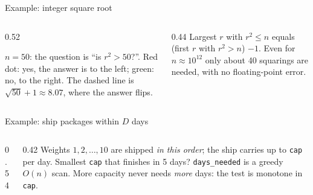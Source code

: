 \documentclass[aspectratio=169,10pt]{beamer}
\begin{document}
\begin{frame}{Example: integer square root}
\begin{columns}[T]
\begin{column}{0.52\textwidth}
\begin{sfig}[0.78]
\begin{tikzpicture}
  
\end{tikzpicture}
\end{sfig}
\vspace{1mm}
{\small $n=50$: the question is ``is $r^2>50$?''. Red dot: yes, the answer is to the left; green: no, to the right. The dashed line is $\sqrt{50}+1\approx 8.07$, where the answer flips.}
\end{column}
\begin{column}{0.44\textwidth}
\vspace{2mm}
\vspace{1mm}
{\small
Largest $r$ with $r^2\le n$ equals (first $r$ with $r^2>n$) $-1$. Even for $n\approx10^{12}$ only about 40 squarings are needed, with no floating-point error.}
\end{column}
\end{columns}
\end{frame}

\begin{frame}{Example: ship packages within $D$ days}
\begin{columns}[T]
\begin{column}{0.54\textwidth}
\end{column}
\begin{column}{0.42\textwidth}
{\small Weights $1,2,\dots,10$ are shipped \emph{in this order}; the ship carries up to \texttt{cap} per day. Smallest \texttt{cap} that finishes in 5 days?}
\vspace{1mm}
\vspace{1mm}
{\small
\texttt{days\_needed} is a greedy $O(n)$ scan. More capacity never needs \emph{more} days: the test is monotone in \texttt{cap}.}
\end{column}
\end{columns}
\end{frame}
\end{document}
